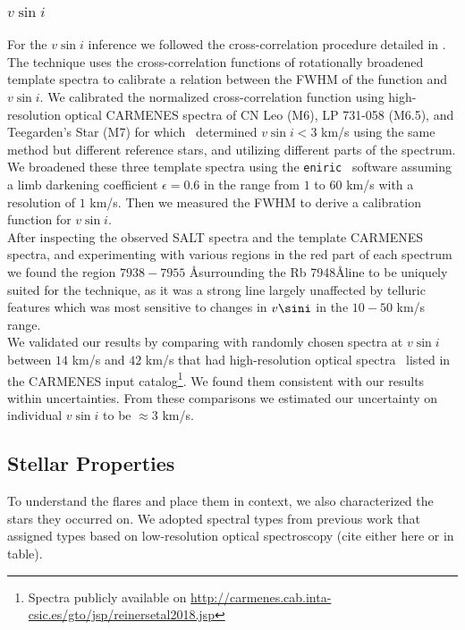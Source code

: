 \documentclass[fleqn,usenatbib,letters]{mnras}%
\begin{document}
\subsubsection{$v\sin i$}
\label{subsec:vsini}
For the $v\sin i$ inference we followed the cross-correlation procedure detailed in \citet{reiners2012}.
The technique uses the cross-correlation functions of rotationally broadened template spectra to calibrate a relation between the FWHM of the function and $v\sin i$. We calibrated the normalized cross-correlation function using high-resolution optical CARMENES spectra of CN Leo (M6), LP 731-058 (M6.5), and Teegarden's Star (M7) for which~\citet{reiners2018} determined $v\sin i < 3$ km/s using the same method but different reference stars, and utilizing different parts of the spectrum. We broadened these three template spectra using the \texttt{eniric}~\citep{neal2019} software assuming a limb darkening coefficient $\epsilon=0.6$ in the range from $1$ to $60$ km/s with a resolution of $1$ km/s. Then we measured the FWHM to derive a calibration function for $v\sin i$.
\\
After inspecting the observed SALT spectra and the template CARMENES spectra, and experimenting with various regions in the red part of each spectrum we found the region $7938-7955$ \AA\;surrounding the Rb 7948\AA\;line to be uniquely suited for the technique, as it was a strong line largely unaffected by telluric features which was most sensitive to changes in $v\sini$ in the $10-50$ km/s range.
\\
We validated our results by comparing with randomly chosen spectra at $v\sin i$ between $14$ km/s and $42$ km/s that had high-resolution optical spectra~\citep{reiners2018} listed in the CARMENES input catalog\citep{jeffers2018}\footnote{Spectra publicly available on \url{http://carmenes.cab.inta-csic.es/gto/jsp/reinersetal2018.jsp}}. We found them consistent with our results within uncertainties. From these comparisons we estimated our uncertainty on individual $v\sin i$ to be $\approx 3$ km/s.

\subsection{Stellar Properties}
\label{sec:props}
To understand the flares and place them in context, we also characterized the stars they occurred on. We adopted spectral types from previous work that assigned types based on low-resolution optical spectroscopy (cite either here or in table).
\end{document}
